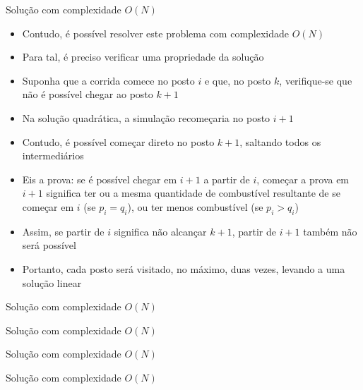 \begin{frame}[fragile]{Solução com complexidade $O(N)$}

    \begin{itemize}
        \item Contudo, é possível resolver este problema com complexidade $O(N)$

        \item Para tal, é preciso verificar uma propriedade da solução 

        \item Suponha que a corrida comece no posto $i$ e que, no posto $k$, verifique-se que
            não é possível chegar ao posto $k + 1$

        \item Na solução quadrática, a simulação recomeçaria no posto $i + 1$

        \item Contudo, é possível começar direto no posto $k + 1$, saltando todos os intermediários

        \item Eis a prova: se é possível chegar em $i + 1$ a partir de $i$, começar a prova em
            $i + 1$ significa ter ou a mesma quantidade de combustível resultante de se 
            começar em $i$ (se $p_i = q_i$), ou ter menos combustível (se $p_i > q_i$)

        \item Assim, se partir de $i$ significa não alcançar $k + 1$, partir de $i + 1$ também
            não será possível

        \item Portanto, cada posto será visitado, no máximo, duas vezes, levando a uma solução
            linear
    \end{itemize}

\end{frame}

\begin{frame}[fragile]{Solução com complexidade $O(N)$}
\end{frame}

\begin{frame}[fragile]{Solução com complexidade $O(N)$}
\end{frame}

\begin{frame}[fragile]{Solução com complexidade $O(N)$}
\end{frame}

\begin{frame}[fragile]{Solução com complexidade $O(N)$}
\end{frame}

